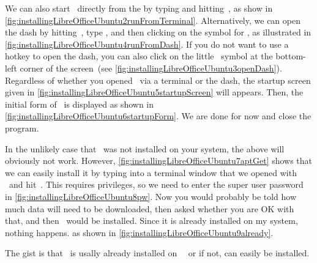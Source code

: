 We can also start \libreofficeBase\ directly from the  by typing  and hitting~\keys{\return}, as show in \cref{fig:installingLibreOfficeUbuntu2runFromTerminal}.
Alternatively, we can open the dash by hitting~\keys{\OSwin}, type , and then clicking on the symbol for \libreofficeBase, as illustrated in \cref{fig:installingLibreOfficeUbuntu4runFromDash}.
If you do not want to use a hotkey to open the dash, you can also click on the little \ubuntu\ symbol at the bottom-left corner of the screen~(see \cref{fig:installingLibreOfficeUbuntu3openDash}).
Regardless of whether you opened \libreofficeBase\ via a terminal or the dash, the startup screen given in \cref{fig:installingLibreOfficeUbuntu5startupScreen} will appears.
Then, the initial form of \libreofficeBase\ is displayed as shown in \cref{fig:installingLibreOfficeUbuntu6startupForm}.
We are done for now and close the program.%
%
\begin{sloppypar}%
In the unlikely case that \libreoffice\ was not installed on your system, the above will obviously not work.
However, \cref{fig:installingLibreOfficeUbuntu7aptGet} shows that we can easily install it by typing  into a terminal window that we opened with \ubuntuTerminal\ and hit~\keys{\return}.
This requires  privileges, so we need to enter the super user password in \cref{fig:installingLibreOfficeUbuntu8pw}.
Now you would probably be told how much data will need to be downloaded, then asked whether you are OK with that, and then \libreoffice\ would be installed.
Since it is already installed on my system, nothing happens. as shown in \cref{fig:installingLibreOfficeUbuntu9already}.%
\end{sloppypar}%
%
The gist is that \libreoffice\ is usally already installed on \ubuntu\ \linux\ or if not, can easily be installed.%
%
\FloatBarrier%
\endhsection%
%
